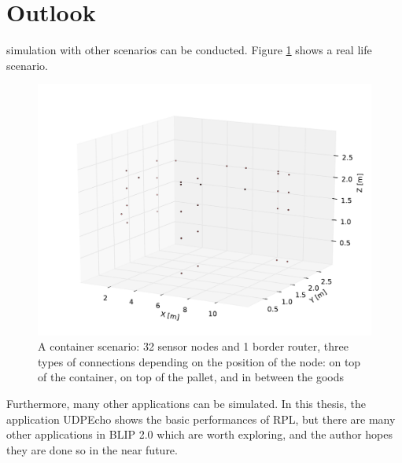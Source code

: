 \section{Outlook}
\label{outlook}
simulation with other scenarios can be conducted. Figure \ref{fig:container} shows a real life scenario. 
\begin{figure}[htbp]
  \begin{center}
    \leavevmode
      \includegraphics[scale=0.45]
      {Pics/container.pdf}
   \caption{A container scenario: 32 sensor nodes and 1 border router, three types of connections depending on the position of the node: on top of the container, on top of the pallet, and in between the goods}
    \label{fig:container}
  \end{center}
\end{figure} 

Furthermore, many other applications can be simulated. In this thesis, the application UDPEcho shows the basic performances of RPL, but there are many other applications in BLIP 2.0 which are worth exploring, and the author
hopes they are done so in the near future.

